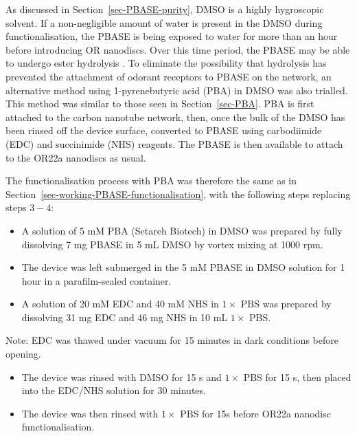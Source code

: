 \documentclass[
  a4paper,
]{scrbook}
\begin{document}
As discussed in Section~\ref{sec-PBASE-purity}, DMSO is a highly
hygroscopic solvent. If a non-negligible amount of water is present in
the DMSO during functionalisation, the PBASE is being exposed to water
for more than an hour before introducing OR nanodiscs. Over this time
period, the PBASE may be able to undergo ester hydrolysis
\autocite{Hermanson2013-3}. To eliminate the possibility that hydrolysis
has prevented the attachment of odorant receptors to PBASE on the
network, an alternative method using 1-pyrenebutyric acid (PBA) in DMSO
was also trialled. This method was similar to those seen in
Section~\ref{sec-PBA}. PBA is first attached to the carbon nanotube
network, then, once the bulk of the DMSO has been rinsed off the device
surface, converted to PBASE using carbodiimide (EDC) and succinimide
(NHS) reagents. The PBASE is then available to attach to the OR22a
nanodiscs as usual.

The functionalisation process with PBA was therefore the same as in
Section~\ref{sec-working-PBASE-functionalisation}, with the following
steps replacing steps \(3-4\):

\begin{itemize}
\item
  A solution of 5 mM PBA (Setareh Biotech) in DMSO was prepared by fully
  dissolving 7 mg PBASE in 5 mL DMSO by vortex mixing at 1000 rpm.
\item
  The device was left submerged in the 5 mM PBASE in DMSO solution for 1
  hour in a parafilm-sealed container.
\item
  A solution of 20 mM EDC and 40 mM NHS in \(1 \times\) PBS was prepared
  by dissolving 31 mg EDC and 46 mg NHS in 10 mL \(1 \times\) PBS.
\end{itemize}

Note: EDC was thawed under vacuum for 15 minutes in dark conditions
before opening.

\begin{itemize}
\item
  The device was rinsed with DMSO for 15 s and \(1 \times\) PBS for 15
  s, then placed into the EDC/NHS solution for 30 minutes.
\item
  The device was then rinsed with \(1 \times\) PBS for 15s before OR22a
  nanodisc functionalisation.
\end{itemize}
\end{document}
